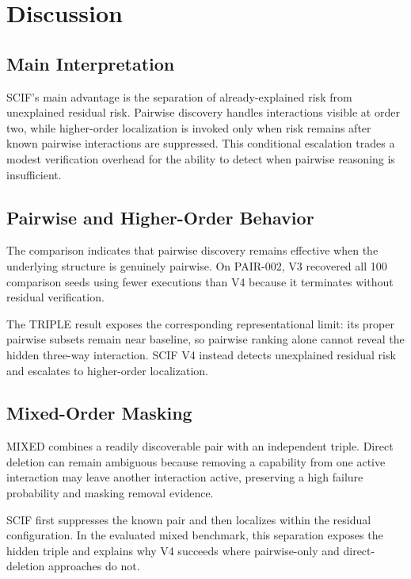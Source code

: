 \section{Discussion}

\subsection{Main Interpretation}

SCIF's main advantage is the separation of already-explained risk from unexplained residual risk. Pairwise discovery handles interactions visible at order two, while higher-order localization is invoked only when risk remains after known pairwise interactions are suppressed. This conditional escalation trades a modest verification overhead for the ability to detect when pairwise reasoning is insufficient.

\subsection{Pairwise and Higher-Order Behavior}

The comparison indicates that pairwise discovery remains effective when the underlying structure is genuinely pairwise. On PAIR-002, V3 recovered all 100 comparison seeds using fewer executions than V4 because it terminates without residual verification.

The TRIPLE result exposes the corresponding representational limit: its proper pairwise subsets remain near baseline, so pairwise ranking alone cannot reveal the hidden three-way interaction. SCIF V4 instead detects unexplained residual risk and escalates to higher-order localization.

\subsection{Mixed-Order Masking}

MIXED combines a readily discoverable pair with an independent triple. Direct deletion can remain ambiguous because removing a capability from one active interaction may leave another interaction active, preserving a high failure probability and masking removal evidence.

SCIF first suppresses the known pair and then localizes within the residual configuration. In the evaluated mixed benchmark, this separation exposes the hidden triple and explains why V4 succeeds where pairwise-only and direct-deletion approaches do not.

